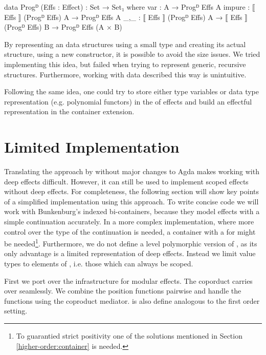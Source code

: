 \begin{code}
data Progᴰ (Effs : Effect) : Set → Set₁ where
  var     : A → Progᴰ Effs A
  impure  : ⟦ Effs ⟧ (Progᴰ Effs) A → Progᴰ Effs A
  _,_     : ⟦ Effs ⟧ (Progᴰ Effs) A → ⟦ Effs ⟧ (Progᴰ Effs) B → Progᴰ Effs (A × B)
\end{code}
By representing an data structures using a small type and creating its actual
structure, using a new  constructor, it is possible to avoid
the size issues.
We tried implementing this idea, but failed when trying to represent generic,
recursive structures.
Furthermore, working with data described this way is unintuitive.

Following the same idea, one could try to store either type variables or data
type representation (e.g. polynomial functors) in the  of
effects and build an effectful representation in the container extension.


\section{Limited Implementation}
\label{higher-order:limited-impl}

Translating the approach by \textcite{DBLP:conf/haskell/WuSH14} without major
changes to Agda makes working with deep effects difficult.
However, it can still be used to implement scoped effects without deep effects.
For completeness, the following section will show key points of a simplified
implementation using this approach.
To write concise code we will work with Bunkenburg's indexed bi-containers,
because they model effects with a simple continuation accurately.
In a more complex implementation, where more control over the type of the
continuation is needed, a container with a  for 
might be needed\footnote{To guarantied strict positivity one of the solutions
  mentioned in Section \ref{higher-order:container} is needed.}.
Furthermore, we do not define a level polymorphic version of ,
as its only advantage is a limited representation of deep effects.
Instead we limit value types to elements of , i.e. those which
can always be scoped.

First we port over the infrastructure for modular effects.
The coporduct carries over seamlessly.
We combine the position functions pairwise and handle the 
functions using the coproduct mediator.
 is also define analogous to the first order
setting.

